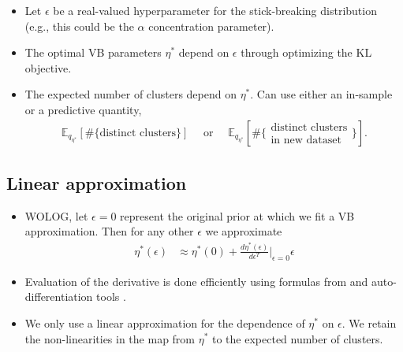 \documentclass[a0,plainsections,30pt]{sciposter}\usepackage[]{graphicx}\usepackage[]{color}
\newcommand{\Expect}{\mathbb{E}}
\begin{document}
\begin{minipage}[t]{0.45\textwidth}
\begin{itemize}

\item Let $\epsilon$ be a real-valued hyperparameter for the stick-breaking distribution
(e.g., this could be the $\alpha$ concentration parameter).

\item The optimal VB parameters $\eta^*$ depend on $\epsilon$ through optimizing the KL objective.

\item The expected number of clusters depend on $\eta^*$. Can use either an in-sample or a predictive quantity,
\vspace{-0.1in}
\begin{align}
\Expect_{q_{\eta^*}} \left[ \#\{\text{distinct clusters}\} \right]
\quad \text{ or } \quad
\Expect_{q_{\eta^*}}
\left[\#\{\substack{\text{distinct clusters}\\\text{in new dataset}}\} \right].
\end{align}
\end{itemize}

\vspace{-0.9in}
\subsection*{Linear approximation}
\vspace{-0.2in}
\begin{itemize}
\item WOLOG, let $\epsilon=0$ represent the original prior at which we fit a VB approximation. Then for any other $\epsilon$ we approximate
\begin{align}
\eta^*(\epsilon)  &\approx  \eta^*(0) +
\frac{d \eta^*(\epsilon)}{d\epsilon^T}\Big|_{\epsilon=0} \epsilon
\label{eq:linear_approx}
\end{align}

\item Evaluation of the derivative is done efficiently using formulas from \cite{giordano:2017:covariances} and auto-differentiation tools \cite{maclaurin:2015:autograd}.

\item We only use a linear approximation for the dependence of $\eta^*$ on $\epsilon$. We retain the non-linearities in the map from $\eta^*$ to the expected number of clusters.


\end{itemize}
\end{minipage}
\end{document}
